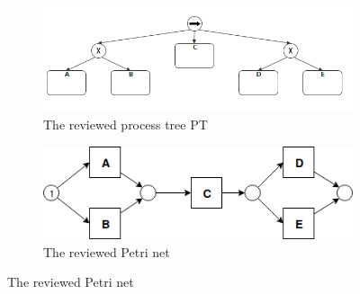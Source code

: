 \begin{figure}
	\centering
	\begin{subfigure}[b]{0.48\textwidth}
		\centering
		\includegraphics[width=\linewidth]{figures/algorithm/PT06_Seq_2_xor_notnested.png}
		\caption{The reviewed process tree PT}
		\label{fig:pt-lt-demo}
	\end{subfigure}%
	\quad
	\begin{subfigure}[b]{0.48\textwidth}
		\centering
		\includegraphics[width=\linewidth]{figures/algorithm/LT_Seq_01_Original.png}
		\caption{The reviewed Petri net}
		\label{fig:pn-lt-demo}
	\end{subfigure}%
\end{figure} 
